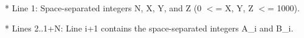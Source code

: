 * Line 1: Space-separated integers N, X, Y, and Z (0 $<$= X, Y, Z $<$=         1000).

* Lines 2..1+N: Line i+1 contains the space-separated integers A\_i and         B\_i.